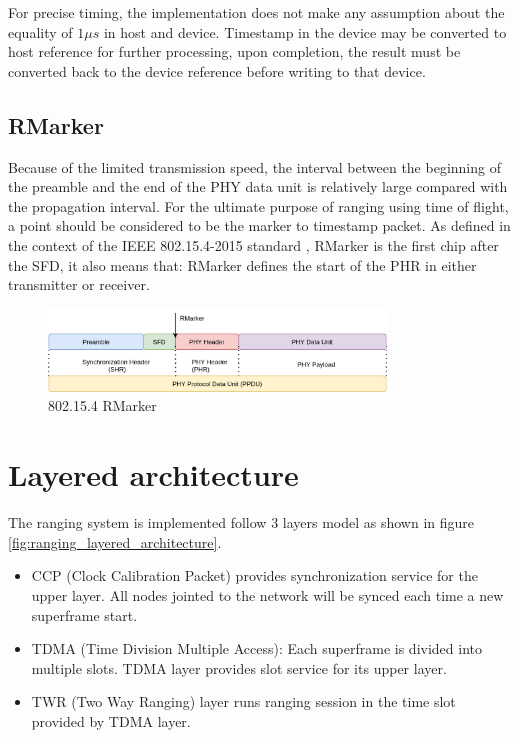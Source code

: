 \documentclass[\main/main.tex]{subfiles}
\begin{document}
For precise timing, the implementation does not make any assumption about the equality of $1\mu s$ in host and device. Timestamp in the device may be converted to host reference for further processing, upon completion, the result must be converted back to the device reference before writing to that device. 
\subsection{RMarker}
Because of the limited transmission speed, the interval between the beginning of the preamble and the end of the PHY data unit is relatively large compared with the propagation interval. For the ultimate purpose of ranging using time of flight, a point should be considered to be the marker to timestamp packet. As defined in the context of the IEEE 802.15.4-2015 standard \cite{IEEE_Std_802_15_4_2015}, RMarker is the first chip after the SFD, it also means that: RMarker defines the start of the PHR in either transmitter or receiver.

\begin{figure}[H]
    \begin{center}
        \includegraphics[width=0.8\textwidth]{802_15_4_physical.png}
    \end{center}
    \caption{802.15.4 RMarker}
    \label{fig:802_15_4_rmarker}
\end{figure}

\section{Layered architecture}
The ranging system is implemented follow 3 layers model as shown in figure \ref{fig:ranging_layered_architecture}. 
\begin{itemize}
    \item CCP (Clock Calibration Packet) provides synchronization service for the upper layer. All nodes jointed to the network will be synced each time a new superframe start.
    \item TDMA (Time Division Multiple Access): Each superframe is divided into multiple slots. TDMA layer provides slot service for its upper layer. 
    \item TWR (Two Way Ranging) layer runs ranging session in the time slot provided by TDMA layer.
\end{itemize}
\end{document}

